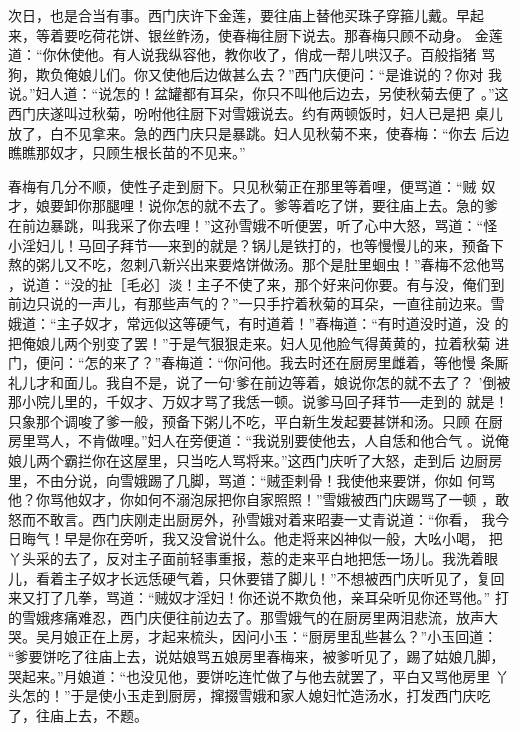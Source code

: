 次日，也是合当有事。西门庆许下金莲，要往庙上替他买珠子穿箍儿戴。早起
来，等着要吃荷花饼、银丝鲊汤，使春梅往厨下说去。那春梅只顾不动身。
金莲道：“你休使他。有人说我纵容他，教你收了，俏成一帮儿哄汉子。百般指猪
骂狗，欺负俺娘儿们。你又使他后边做甚么去？”西门庆便问：“是谁说的？你对
我说。”妇人道：“说怎的！盆罐都有耳朵，你只不叫他后边去，另使秋菊去便了
。”这西门庆遂叫过秋菊，吩咐他往厨下对雪娥说去。约有两顿饭时，妇人已是把
桌儿放了，白不见拿来。急的西门庆只是暴跳。妇人见秋菊不来，使春梅：“你去
后边瞧瞧那奴才，只顾生根长苗的不见来。”

春梅有几分不顺，使性子走到厨下。只见秋菊正在那里等着哩，便骂道：“贼
奴才，娘要卸你那腿哩！说你怎的就不去了。爹等着吃了饼，要往庙上去。急的爹
在前边暴跳，叫我采了你去哩！”这孙雪娥不听便罢，听了心中大怒，骂道：“怪
小淫妇儿！马回子拜节──来到的就是？锅儿是铁打的，也等慢慢儿的来，预备下
熬的粥儿又不吃，忽剌八新兴出来要烙饼做汤。那个是肚里蛔虫！”春梅不忿他骂
，说道：“没的扯［毛必］淡！主子不使了来，那个好来问你要。有与没，俺们到
前边只说的一声儿，有那些声气的？”一只手拧着秋菊的耳朵，一直往前边来。雪
娥道：“主子奴才，常远似这等硬气，有时道着！”春梅道：“有时道没时道，没
的把俺娘儿两个别变了罢！”于是气狠狠走来。妇人见他脸气得黄黄的，拉着秋菊
进门，便问：“怎的来了？”春梅道：“你问他。我去时还在厨房里雌着，等他慢
条厮礼儿才和面儿。我自不是，说了一句‘爹在前边等着，娘说你怎的就不去了？
’倒被那小院儿里的，千奴才、万奴才骂了我恁一顿。说爹马回子拜节──走到的
就是！只象那个调唆了爹一般，预备下粥儿不吃，平白新生发起要甚饼和汤。只顾
在厨房里骂人，不肯做哩。”妇人在旁便道：“我说别要使他去，人自恁和他合气
。说俺娘儿两个霸拦你在这屋里，只当吃人骂将来。”这西门庆听了大怒，走到后
边厨房里，不由分说，向雪娥踢了几脚，骂道：“贼歪剌骨！我使他来要饼，你如
何骂他？你骂他奴才，你如何不溺泡尿把你自家照照！”雪娥被西门庆踢骂了一顿
，敢怒而不敢言。西门庆刚走出厨房外，孙雪娥对着来昭妻一丈青说道：“你看，
我今日晦气！早是你在旁听，我又没曾说什么。他走将来凶神似一般，大吆小喝，
把丫头采的去了，反对主子面前轻事重报，惹的走来平白地把恁一场儿。我洗着眼
儿，看着主子奴才长远恁硬气着，只休要错了脚儿！”不想被西门庆听见了，复回
来又打了几拳，骂道：“贼奴才淫妇！你还说不欺负他，亲耳朵听见你还骂他。”
打的雪娥疼痛难忍，西门庆便往前边去了。那雪娥气的在厨房里两泪悲流，放声大
哭。吴月娘正在上房，才起来梳头，因问小玉：“厨房里乱些甚么？”小玉回道：
“爹要饼吃了往庙上去，说姑娘骂五娘房里春梅来，被爹听见了，踢了姑娘几脚，
哭起来。”月娘道：“也没见他，要饼吃连忙做了与他去就罢了，平白又骂他房里
丫头怎的！”于是使小玉走到厨房，撺掇雪娥和家人媳妇忙造汤水，打发西门庆吃
了，往庙上去，不题。

